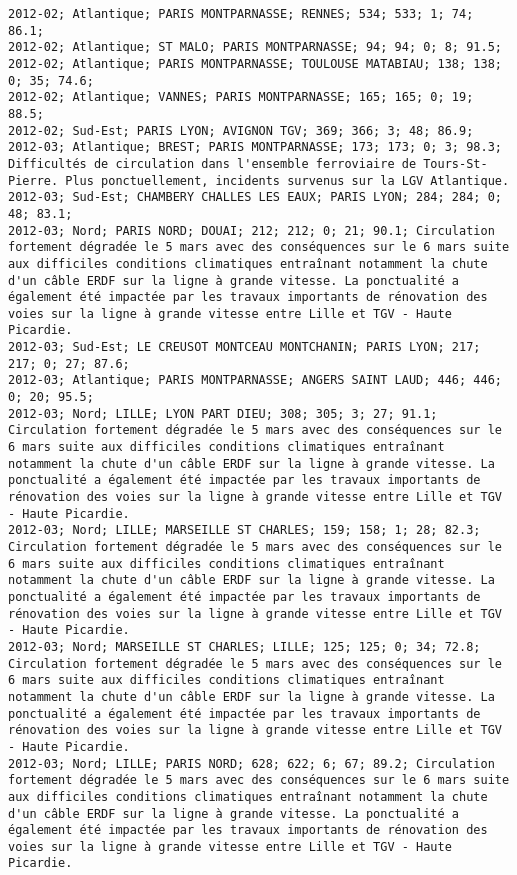 \documentclass{article}
\begin{document}
\begin{Verbatim}[commandchars=\\\{\}]
2012-02; Atlantique; PARIS MONTPARNASSE; RENNES; 534; 533; 1; 74; 86.1; 
2012-02; Atlantique; ST MALO; PARIS MONTPARNASSE; 94; 94; 0; 8; 91.5; 
2012-02; Atlantique; PARIS MONTPARNASSE; TOULOUSE MATABIAU; 138; 138; 0; 35; 74.6; 
2012-02; Atlantique; VANNES; PARIS MONTPARNASSE; 165; 165; 0; 19; 88.5; 
2012-02; Sud-Est; PARIS LYON; AVIGNON TGV; 369; 366; 3; 48; 86.9; 
2012-03; Atlantique; BREST; PARIS MONTPARNASSE; 173; 173; 0; 3; 98.3; Difficultés de circulation dans l'ensemble ferroviaire de Tours-St-Pierre. Plus ponctuellement, incidents survenus sur la LGV Atlantique.
2012-03; Sud-Est; CHAMBERY CHALLES LES EAUX; PARIS LYON; 284; 284; 0; 48; 83.1; 
2012-03; Nord; PARIS NORD; DOUAI; 212; 212; 0; 21; 90.1; Circulation fortement dégradée le 5 mars avec des conséquences sur le 6 mars suite aux difficiles conditions climatiques entraînant notamment la chute d'un câble ERDF sur la ligne à grande vitesse. La ponctualité a également été impactée par les travaux importants de rénovation des voies sur la ligne à grande vitesse entre Lille et TGV - Haute Picardie.
2012-03; Sud-Est; LE CREUSOT MONTCEAU MONTCHANIN; PARIS LYON; 217; 217; 0; 27; 87.6; 
2012-03; Atlantique; PARIS MONTPARNASSE; ANGERS SAINT LAUD; 446; 446; 0; 20; 95.5; 
2012-03; Nord; LILLE; LYON PART DIEU; 308; 305; 3; 27; 91.1; Circulation fortement dégradée le 5 mars avec des conséquences sur le 6 mars suite aux difficiles conditions climatiques entraînant notamment la chute d'un câble ERDF sur la ligne à grande vitesse. La ponctualité a également été impactée par les travaux importants de rénovation des voies sur la ligne à grande vitesse entre Lille et TGV - Haute Picardie.
2012-03; Nord; LILLE; MARSEILLE ST CHARLES; 159; 158; 1; 28; 82.3; Circulation fortement dégradée le 5 mars avec des conséquences sur le 6 mars suite aux difficiles conditions climatiques entraînant notamment la chute d'un câble ERDF sur la ligne à grande vitesse. La ponctualité a également été impactée par les travaux importants de rénovation des voies sur la ligne à grande vitesse entre Lille et TGV - Haute Picardie.
2012-03; Nord; MARSEILLE ST CHARLES; LILLE; 125; 125; 0; 34; 72.8; Circulation fortement dégradée le 5 mars avec des conséquences sur le 6 mars suite aux difficiles conditions climatiques entraînant notamment la chute d'un câble ERDF sur la ligne à grande vitesse. La ponctualité a également été impactée par les travaux importants de rénovation des voies sur la ligne à grande vitesse entre Lille et TGV - Haute Picardie.
2012-03; Nord; LILLE; PARIS NORD; 628; 622; 6; 67; 89.2; Circulation fortement dégradée le 5 mars avec des conséquences sur le 6 mars suite aux difficiles conditions climatiques entraînant notamment la chute d'un câble ERDF sur la ligne à grande vitesse. La ponctualité a également été impactée par les travaux importants de rénovation des voies sur la ligne à grande vitesse entre Lille et TGV - Haute Picardie.

\end{Verbatim}
\end{document}
